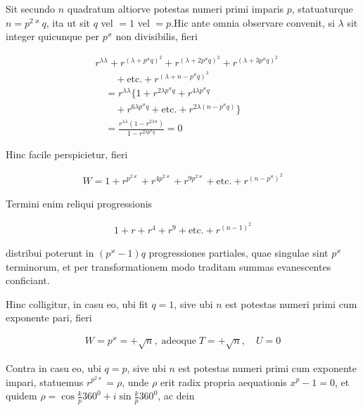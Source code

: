 
Sit secundo $n$ quadratum altiorve potestas numeri primi imparis $p$, statuaturque $n=p^{2\varkappa}q$, ita ut sit $q$ vel $=1$ vel $=p$.\quad Hic ante omnia observare convenit, si $\lambda$ sit integer quicunque per $p^\varkappa$ non divisibilis, fieri


\[
\begin{aligned}
&r^{\lambda\lambda}+r^{(\lambda+p^\varkappa q)^2}+r^{(\lambda+2p^\varkappa q)^2}+r^{(\lambda+3p^\varkappa q)^2}\\&\qquad+\text{etc.}+r^{(\lambda+n-p^\varkappa q)^{3}}\\
&\quad=r^{\lambda\lambda}\{1+r^{2\lambda p^\varkappa q}+r^{4\lambda p^\varkappa q}\\&\qquad+r^{6\lambda p^\varkappa q}+\text{etc.}+r^{2\lambda(n-p^\varkappa q)}\}\\&\quad=\frac{r^{\lambda\lambda}(1-r^{2\lambda n})}{1-r^{2\lambda p^\varkappa q}}=0
\end{aligned}
\]

Hinc facile perspicietur, fieri

\[
\begin{aligned}
W=1+r^{p^{2\varkappa}}+r^{4p^{2\varkappa}}+r^{9p^{2\varkappa}}+\text{etc.}+r^{(n-p^\varkappa)^2}
\end{aligned}
\]

Termini enim reliqui progressionis

\[
\begin{aligned}
1+r+r^4+r^9+\text{etc.}+r^{(n-1)^2}
\end{aligned}
\]

distribui poterunt in $(p^\varkappa-1)q$ progressiones partiales, quae singulae sint $p^\varkappa$ terminorum, et per transformationem modo traditam summas evanescentes conficiant.

Hinc colligitur, in casu eo, ubi fit $q=1$, sive ubi $n$ est potestas numeri primi cum exponente pari, fieri

\[
\begin{aligned}
W=p^\varkappa=+\surd n,\;\text{adeoque}\;T=+\surd n,\quad U=0
\end{aligned}
\]

Contra in casu eo, ubi $q=p$, sive ubi $n$ est potestas numeri primi cum exponente impari, statuemus $r^{p^{2\varkappa}}=\rho$, unde $\rho$ erit radix propria aequationis $x^p-1=0$, et quidem $\rho=\cos\frac{k}{p}360^0+i\sin\frac{k}{p}360^0$, ac dein

